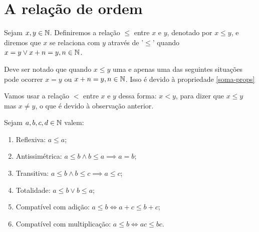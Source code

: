 \documentclass[../main.tex]{subfiles}
\begin{document}
\section{A relação de ordem}
\begin{defi}\label{def-relOrdem-N}
Sejam $x, y \in \mathbb{N}$. Definiremos a relação $\leq$ entre $x$ e $y$, denotado por $x \leq y$, e diremos que $x$ se relaciona com $y$ através de '$\leq$' quando $x = y \lor x + n = y, n \in \mathbb{N}$.
\end{defi}
\begin{obs}
    Deve ser notado que quando $x \leq y$ uma e apenas uma das seguintes situações pode ocorrer $x = y$ ou $x + n = y, n \in \mathbb{N}$. Isso é devido à propriedade \ref{soma-props}
\end{obs}
\begin{defi}
    Vamos usar a relação $<$ entre $x$ e $y$ dessa forma: $x < y$, para dizer que $x \leq y$ mas $x \neq y$, o que é devido à observação anterior. 
\end{defi}
\begin{prop}{Sejam $a, b, c, d \in \mathbb{N}$ valem:}
    \begin{enumerate}[label=(\roman*)]
        \item Reflexiva: $a \leq a$;
        \item Antissimétrica: $a \leq b \land b \leq a \implies a = b$;
        \item Transitiva: $a \leq b \land b \leq c \implies a \leq c$;
        \item Totalidade: $a \leq b \lor b \leq a$;
        \item Compatível com adição: $a \leq b \iff a + c \leq b + c$;
        \item Compatível com multiplicação: $a \leq b \iff ac \leq bc$.
    \end{enumerate}
\end{prop}
\end{document}
